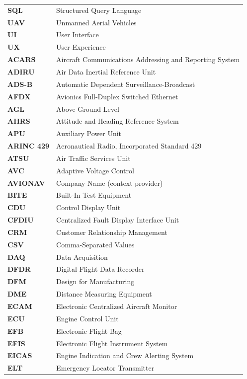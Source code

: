 \begin{longtable}{p{3cm}p{11cm}}
\textbf{SQL} & Structured Query Language \\
\textbf{UAV} & Unmanned Aerial Vehicles \\
\textbf{UI} & User Interface \\
\textbf{UX} & User Experience \\
\textbf{ACARS} & Aircraft Communications Addressing and Reporting System \\
\textbf{ADIRU} & Air Data Inertial Reference Unit \\
\textbf{ADS-B} & Automatic Dependent Surveillance-Broadcast \\
\textbf{AFDX} & Avionics Full-Duplex Switched Ethernet \\
\textbf{AGL} & Above Ground Level \\
\textbf{AHRS} & Attitude and Heading Reference System \\
\textbf{APU} & Auxiliary Power Unit \\
\textbf{ARINC 429} & Aeronautical Radio, Incorporated Standard 429 \\
\textbf{ATSU} & Air Traffic Services Unit \\
\textbf{AVC} & Adaptive Voltage Control \\
\textbf{AVIONAV} & Company Name (context provider) \\
\textbf{BITE} & Built-In Test Equipment \\
\textbf{CDU} & Control Display Unit \\
\textbf{CFDIU} & Centralized Fault Display Interface Unit \\
\textbf{CRM} & Customer Relationship Management \\
\textbf{CSV} & Comma-Separated Values \\
\textbf{DAQ} & Data Acquisition \\
\textbf{DFDR} & Digital Flight Data Recorder \\
\textbf{DFM} & Design for Manufacturing \\
\textbf{DME} & Distance Measuring Equipment \\
\textbf{ECAM} & Electronic Centralized Aircraft Monitor \\
\textbf{ECU} & Engine Control Unit \\
\textbf{EFB} & Electronic Flight Bag \\
\textbf{EFIS} & Electronic Flight Instrument System \\
\textbf{EICAS} & Engine Indication and Crew Alerting System \\
\textbf{ELT} & Emergency Locator Transmitter \\

\end{longtable}
